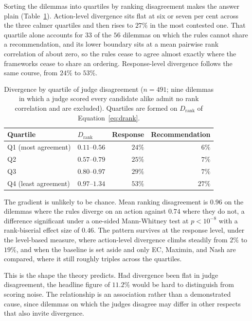 \documentclass[10pt,twocolumn,a4paper]{article}
\begin{document}
Sorting the dilemmas into quartiles by ranking disagreement makes the
answer plain (Table~\ref{tab:conditional}). Action-level divergence sits
flat at six or seven per cent across the three calmer quartiles and then
rises to $27\%$ in the most contested one. That quartile alone accounts
for $33$ of the $56$ dilemmas on which the rules cannot share a
recommendation, and its lower boundary sits at a mean pairwise rank
correlation of about zero, so the rules cease to agree almost exactly
where the frameworks cease to share an ordering. Response-level
divergence follows the same course, from $24\%$ to $53\%$.

\begin{table}[htbp]
\centering
\small
\caption{Divergence by quartile of judge disagreement
($n = 491$; nine dilemmas in which a judge scored every candidate alike
admit no rank correlation and are excluded). Quartiles are formed on
$D_{\text{rank}}$ of Equation~\ref{eq:drank}.}
\label{tab:conditional}
\vspace{2pt}
\begin{tabular}{@{}l l r r@{}}
\toprule
\textbf{Quartile} & $D_{\text{rank}}$ & \textbf{Response} & \textbf{Recommendation} \\
\midrule
Q1 (most agreement)  & $0.11$--$0.56$ & $24\%$ & $6\%$  \\
Q2                   & $0.57$--$0.79$ & $25\%$ & $7\%$  \\
Q3                   & $0.80$--$0.97$ & $29\%$ & $7\%$  \\
Q4 (least agreement) & $0.97$--$1.34$ & $53\%$ & $27\%$ \\
\bottomrule
\end{tabular}
\end{table}

The gradient is unlikely to be chance. Mean ranking disagreement is
$0.96$ on the dilemmas where the rules diverge on an action against
$0.74$ where they do not, a difference significant under a one-sided
Mann-Whitney test at $p < 10^{-8}$ with a rank-biserial effect size of
$0.46$. The pattern survives at the response level, under the
level-based measure, where action-level divergence climbs steadily from
$2\%$ to $19\%$, and when the baseline is set aside and only EC,
Maximin, and Nash are compared, where it still roughly triples across
the quartiles.

This is the shape the theory predicts. Had divergence been flat in
judge disagreement, the headline figure of $11.2\%$ would be hard to
distinguish from scoring noise. The relationship is an association
rather than a demonstrated cause, since dilemmas on which the judges
disagree may differ in other respects that also invite divergence.
\end{document}
